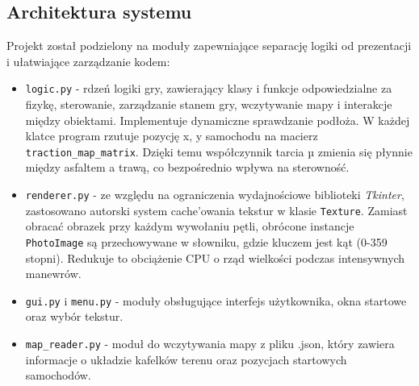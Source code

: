 \documentclass{article}
\begin{document}
\subsection{Architektura systemu}
Projekt został podzielony na moduły zapewniające separację logiki od prezentacji i ułatwiające zarządzanie kodem:
\begin{itemize}
    \item \texttt{logic.py} - rdzeń logiki gry, zawierający klasy i funkcje odpowiedzialne za fizykę, sterowanie, zarządzanie stanem gry, wczytywanie mapy i interakcje między obiektami. Implementuje dynamiczne sprawdzanie podłoża. W każdej klatce program rzutuje pozycję x, y samochodu na macierz \texttt{traction\_map\_matrix}. Dzięki temu współczynnik tarcia µ zmienia się płynnie między asfaltem a trawą, co bezpośrednio wpływa na sterowność.
    \item \texttt{renderer.py} - ze względu na ograniczenia wydajnościowe biblioteki \textit{Tkinter}, zastosowano autorski system cache'owania tekstur w klasie \texttt{Texture}. Zamiast obracać obrazek przy każdym wywołaniu pętli, obrócone instancje \texttt{PhotoImage} są przechowywane w słowniku, gdzie kluczem jest kąt (0-359 stopni). Redukuje to obciążenie CPU o rząd wielkości podczas intensywnych manewrów.
    \item \texttt{gui.py} i \texttt{menu.py} - moduły obsługujące interfejs użytkownika, okna startowe oraz wybór tekstur.
    \item \texttt{map\_reader.py} - moduł do wczytywania mapy z pliku .json, który zawiera informacje o układzie kafelków terenu oraz pozycjach startowych samochodów.
\end{itemize}
\end{document}
